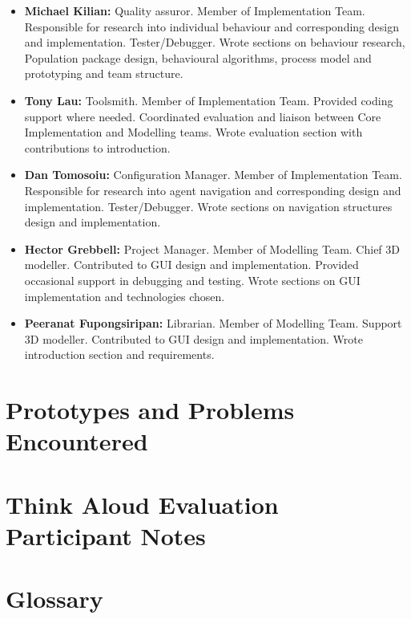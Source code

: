 \documentclass{l3proj}
\begin{document}
\begin{itemize}
\item{\textbf{Michael Kilian:} Quality assuror. Member of Implementation Team. Responsible for research into individual behaviour and corresponding design and implementation. Tester/Debugger. Wrote sections on behaviour research, Population package design, behavioural algorithms, process model and prototyping and team structure.}
\item{\textbf{Tony Lau:} Toolsmith. Member of Implementation Team. Provided coding support where needed. Coordinated evaluation and liaison between Core Implementation and Modelling teams. Wrote evaluation section with contributions to introduction. }
\item{\textbf{Dan Tomosoiu:} Configuration Manager. Member of Implementation Team. Responsible for research into agent navigation and corresponding design and implementation. Tester/Debugger. Wrote sections on navigation structures design and implementation.}
\item{\textbf{Hector Grebbell:} Project Manager. Member of Modelling Team. Chief 3D modeller. Contributed to GUI design and implementation. Provided occasional support in debugging and testing. Wrote sections on GUI implementation and technologies chosen.}
\item{\textbf{Peeranat Fupongsiripan:} Librarian. Member of Modelling Team. Support 3D modeller. Contributed to GUI design and implementation. Wrote introduction section and requirements. }
\end{itemize}

\clearpage
\appendix
{}


\chapter{Prototypes and Problems Encountered}


\chapter{Think Aloud Evaluation Participant Notes}



\chapter{Glossary}









\end{document}
